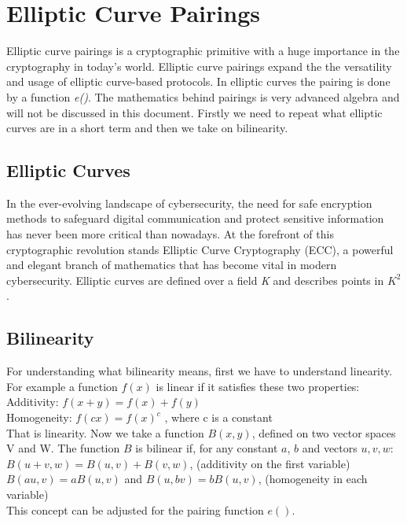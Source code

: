 \documentclass{article}
\begin{document}
\section{Elliptic Curve Pairings}
Elliptic curve pairings is a cryptographic primitive with a huge importance in the cryptography in today's world. Elliptic curve pairings expand the the versatility and usage of elliptic curve-based protocols. In elliptic curves the pairing is done by a function \textit{e()}. The mathematics behind pairings is very advanced algebra and will not be discussed in this document. Firstly we need to repeat what elliptic curves are in a short term and then we take on bilinearity.

\subsection{Elliptic Curves}

In the ever-evolving landscape of cybersecurity, the need for safe encryption methods to safeguard digital communication and protect sensitive information has never been more critical than nowadays. At the forefront of this cryptographic revolution stands Elliptic Curve Cryptography (ECC), a powerful and elegant branch of mathematics that has become vital in modern cybersecurity. 
Elliptic curves are defined over a field \textit{K} and describes points in \(K^2\).

\subsection{Bilinearity}
For understanding what bilinearity means, first we have to understand linearity. For example a function \(f(x)\) is linear if it satisfies these two properties: \\
Additivity: \(f(x + y) = f(x) + f(y)\) \\
Homogeneity: \(f(cx) = f(x)^c\) , where c is a constant \\
That is linearity. Now we take a function \(B(x,y)\), defined on two vector spaces V and W. The function \(B\) is bilinear if, for any constant \(a\), \(b\) and vectors \(u, v, w\): \\
\(B(u+v,w) = B(u,v) + B(v,w)\), (additivity on the first variable) \\
\(B(au,v) = aB(u,v)\) and \(B(u,bv) = bB(u,v)\), (homogeneity in each variable) \\
This concept can be adjusted for the pairing function \(e()\).
\end{document}
